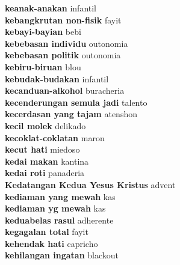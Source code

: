 \textbf{ keanak-anakan  } infantil \\
\textbf{ kebangkrutan non-fisik  } fayit \\
\textbf{ kebayi-bayian  } bebi \\
\textbf{ kebebasan individu  } outonomia \\
\textbf{ kebebasan politik  } outonomia \\
\textbf{ kebiru-biruan  } blou \\
\textbf{ kebudak-budakan  } infantil \\
\textbf{ kecanduan-alkohol  } buracheria \\
\textbf{ kecenderungan semula jadi  } talento \\
\textbf{ kecerdasan yang tajam  } atenshon \\
\textbf{ kecil molek  } delikado \\
\textbf{ kecoklat-coklatan  } maron \\
\textbf{ kecut hati  } miedoso \\
\textbf{ kedai makan  } kantina \\
\textbf{ kedai roti  } panaderia \\
\textbf{ Kedatangan Kedua Yesus Kristus  } advent \\
\textbf{ kediaman yang mewah  } kas \\
\textbf{ kediaman yg mewah  } kas \\
\textbf{ keduabelas rasul  } adherente \\
\textbf{ kegagalan total  } fayit \\
\textbf{ kehendak hati  } capricho \\
\textbf{ kehilangan ingatan  } blackout \\
